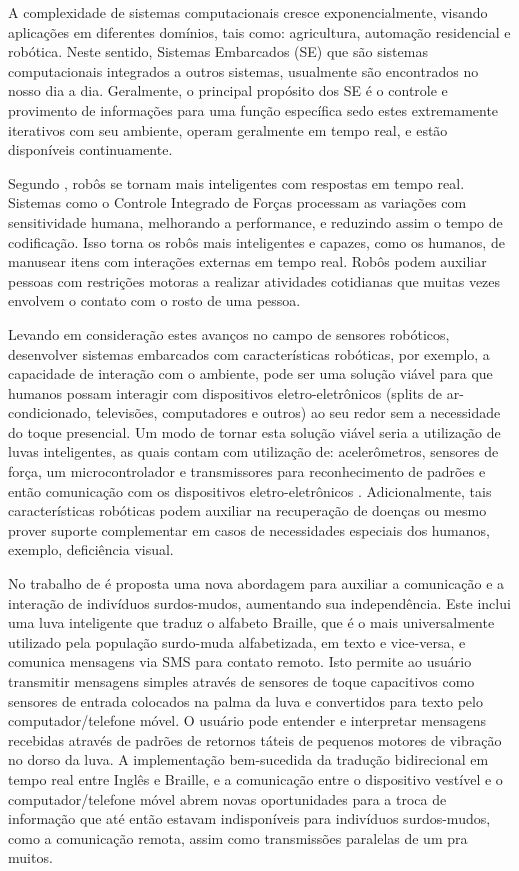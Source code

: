 A complexidade de sistemas computacionais cresce exponencialmente, visando aplicações em diferentes domínios, tais como: agricultura, automação residencial e robótica. Neste sentido, Sistemas Embarcados (SE) que são sistemas computacionais integrados a outros sistemas, usualmente são encontrados no nosso dia a dia. Geralmente, o principal propósito dos SE é o controle e provimento de informações para uma função específica \cite{RAMESH:2012} sedo estes extremamente iterativos com seu ambiente, operam geralmente em tempo real, e estão disponíveis continuamente. 


Segundo , robôs se tornam mais inteligentes com respostas em tempo real. Sistemas como o Controle Integrado de Forças processam as variações com sensitividade humana, melhorando a performance, e reduzindo assim o tempo de codificação. Isso torna os robôs mais inteligentes e capazes, como os humanos, de manusear itens com interações externas em tempo real. Robôs podem auxiliar pessoas com restrições motoras a realizar atividades cotidianas que muitas vezes envolvem o contato com o rosto de uma pessoa.


Levando em consideração estes avanços no campo de sensores robóticos, desenvolver sistemas embarcados com características robóticas, por exemplo, a capacidade de interação com o ambiente, pode ser uma solução viável para que humanos possam interagir com dispositivos eletro-eletrônicos (splits de ar-condicionado, televisões, computadores e outros) ao seu redor sem a necessidade do toque presencial. Um modo de tornar esta solução viável seria a utilização de luvas inteligentes, as quais contam com utilização de: acelerômetros, sensores de força, um microcontrolador e transmissores \cite{WESTERFELD:2012} para reconhecimento de padrões e então comunicação com os dispositivos eletro-eletrônicos \cite{OFLYNN:2013} \cite{BERNIERI:2015} \cite{CHOUDHARY:2015}. Adicionalmente, tais características robóticas podem auxiliar na recuperação de doenças ou mesmo prover suporte complementar em casos de necessidades especiais dos humanos, exemplo, deficiência visual.


No trabalho de  é proposta uma nova abordagem para auxiliar a comunicação e a interação de indivíduos surdos-mudos, aumentando sua independência. Este inclui uma luva inteligente que traduz o alfabeto Braille, que é o mais universalmente utilizado pela população surdo-muda alfabetizada, em texto e vice-versa, e comunica mensagens via SMS para contato remoto. Isto permite ao usuário transmitir mensagens simples através de sensores de toque capacitivos como sensores de entrada colocados na palma da luva e convertidos para texto pelo computador/telefone móvel. O usuário pode entender e interpretar mensagens recebidas através de padrões de retornos táteis de pequenos motores de vibração no dorso da luva. A implementação bem-sucedida da tradução bidirecional em tempo real entre Inglês e Braille, e a comunicação entre o dispositivo vestível e o computador/telefone móvel abrem novas oportunidades para a troca de informação que até então estavam indisponíveis para indivíduos surdos-mudos, como a comunicação remota, assim como transmissões paralelas de um pra muitos.


